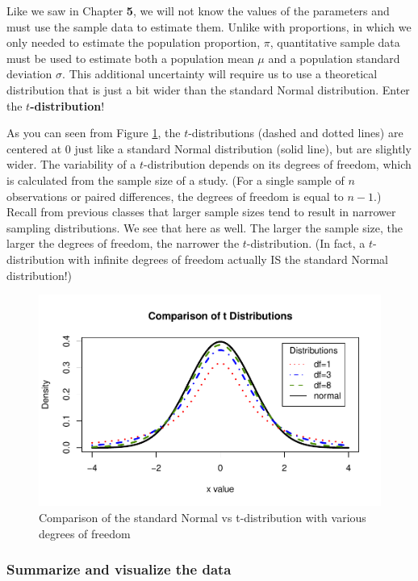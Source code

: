 \documentclass[
]{report}
\begin{document}
Like we saw in Chapter \textbf{5}, we will not know the values of the parameters and must use the sample data to estimate them. Unlike with proportions, in which we only needed to estimate the population proportion, \(\pi\), quantitative sample data must be used to estimate both a population mean \(\mu\) and a population standard deviation \(\sigma\). This additional uncertainty will require us to use a theoretical distribution that is just a bit wider than the standard Normal distribution. Enter the \textbf{\(t\)-distribution}!

As you can seen from Figure \ref{fig:tdist}, the \(t\)-distributions (dashed and dotted lines) are centered at 0 just like a standard Normal distribution (solid line), but are slightly wider. The variability of a \(t\)-distribution depends on its degrees of freedom, which is calculated from the sample size of a study. (For a single sample of \(n\) observations or paired differences, the degrees of freedom is equal to \(n-1\).) Recall from previous classes that larger sample sizes tend to result in narrower sampling distributions. We see that here as well. The larger the sample size, the larger the degrees of freedom, the narrower the \(t\)-distribution. (In fact, a \(t\)-distribution with infinite degrees of freedom actually IS the standard Normal distribution!)

\begin{figure}

{\centering \includegraphics[width=0.7\linewidth]{06-A13-quantitative_theory_files/figure-latex/tdist-1} 

}

\caption{Comparison of the standard Normal vs t-distribution with various degrees of freedom}\label{fig:tdist}
\end{figure}

\subsubsection*{Summarize and visualize the data}\label{summarize-and-visualize-the-data-2}
\end{document}

